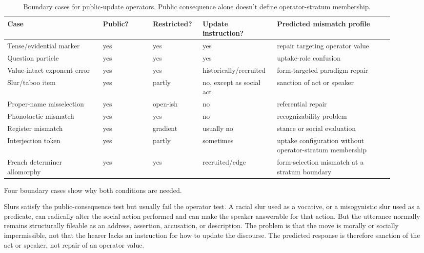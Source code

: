 \documentclass[12pt,letterpaper]{article}
\begin{document}
\begin{table}[ht]
\centering
\scriptsize
\setlength{\tabcolsep}{3pt}
\begin{tabular}{@{}>{\raggedright\arraybackslash}p{0.23\linewidth}
                >{\centering\arraybackslash}p{0.12\linewidth}
                >{\centering\arraybackslash}p{0.12\linewidth}
                >{\centering\arraybackslash}p{0.16\linewidth}
                >{\raggedright\arraybackslash}p{0.29\linewidth}@{}}
\toprule
\textbf{Case} & \textbf{Public?} & \textbf{Restricted?} & \textbf{Update instruction?} & \textbf{Predicted mismatch profile} \\
\midrule
Tense/evidential marker & yes & yes & yes & repair targeting operator value \\
Question particle & yes & yes & yes & uptake-role confusion \\
Value-intact exponent error & yes & yes & historically/recruited & form-targeted paradigm repair \\
Slur/taboo item & yes & partly & no, except as social act & sanction of act or speaker \\
Proper-name misselection & yes & open-ish & no & referential repair \\
Phonotactic mismatch & yes & yes & no & recognizability problem \\
Register mismatch & yes & gradient & usually no & stance or social evaluation \\
Interjection token & yes & partly & sometimes & uptake configuration without operator-stratum membership \\
French determiner allomorphy & yes & yes & recruited/edge & form-selection mismatch at a stratum boundary \\
\bottomrule
\end{tabular}
\caption{Boundary cases for public-update operators. Public consequence alone doesn't define operator-stratum membership.}
\label{tab:boundary-cases}
\end{table}

Four boundary cases show why both conditions are needed.

Slurs satisfy the public-consequence test but usually fail the operator test. A racial slur used as a vocative, or a misogynistic slur used as a predicate, can radically alter the social action performed and can make the speaker answerable for that action. But the utterance normally remains structurally fileable as an address, assertion, accusation, or description. The problem is that the move is morally or socially impermissible, not that the hearer lacks an instruction for how to update the discourse. The predicted response is therefore sanction of the act or speaker, not repair of an operator value.
\end{document}
